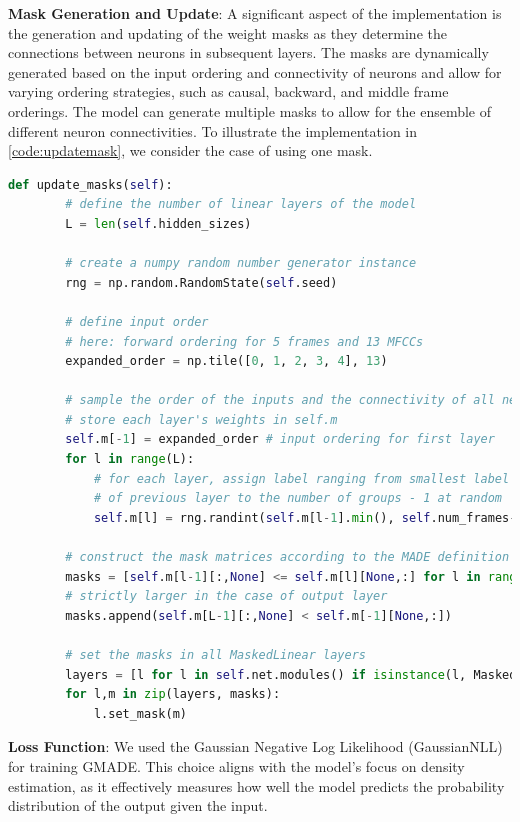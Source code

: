 \textbf{Mask Generation and Update}: A significant aspect of the implementation is the generation and updating of the weight masks as they determine the connections between neurons in subsequent layers. The masks are dynamically generated based on the input ordering and connectivity of neurons and allow for varying ordering strategies, such as causal, backward, and middle frame orderings. The model can generate multiple masks to allow for the ensemble of different neuron connectivities. To illustrate the implementation in \autoref{code:updatemask}, we consider the case of using one mask.
\begin{lstlisting}[label=code:updatemask, language=Python,caption={PyTorch implementation of the mask generation, adapted from Karpathy, Andrej (2018)~\cite{githubMADE}}]
    def update_masks(self):
        # define the number of linear layers of the model
        L = len(self.hidden_sizes)
        
        # create a numpy random number generator instance
        rng = np.random.RandomState(self.seed)

        # define input order
        # here: forward ordering for 5 frames and 13 MFCCs
        expanded_order = np.tile([0, 1, 2, 3, 4], 13)
        
        # sample the order of the inputs and the connectivity of all neurons
        # store each layer's weights in self.m
        self.m[-1] = expanded_order # input ordering for first layer
        for l in range(L):
            # for each layer, assign label ranging from smallest label
            # of previous layer to the number of groups - 1 at random
            self.m[l] = rng.randint(self.m[l-1].min(), self.num_frames-1, size=self.hidden_sizes[l])
        
        # construct the mask matrices according to the MADE definition
        masks = [self.m[l-1][:,None] <= self.m[l][None,:] for l in range(L)]
        # strictly larger in the case of output layer
        masks.append(self.m[L-1][:,None] < self.m[-1][None,:])
        
        # set the masks in all MaskedLinear layers
        layers = [l for l in self.net.modules() if isinstance(l, MaskedLinear)]
        for l,m in zip(layers, masks):
            l.set_mask(m)
\end{lstlisting}
\textbf{Loss Function}: We used the Gaussian Negative Log Likelihood (GaussianNLL) for training GMADE. This choice aligns with the model's focus on density estimation, as it effectively measures how well the model predicts the probability distribution of the output given the input.
